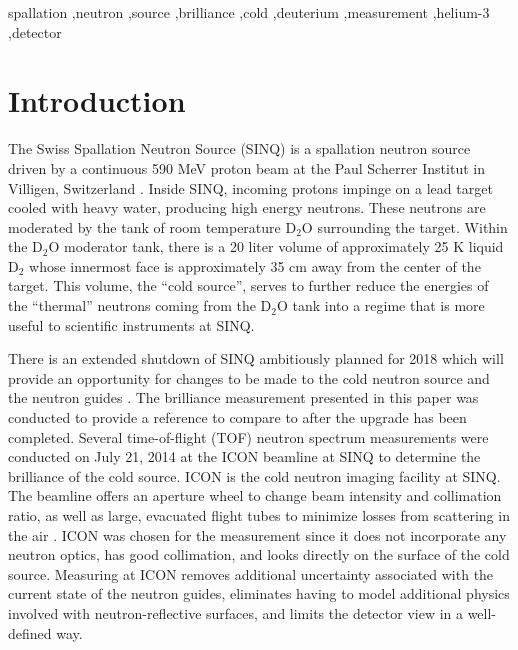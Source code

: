 \documentclass[5p,12pt]{elsarticle}
\begin{document}
\begin{frontmatter}
\begin{abstract}
\end{abstract}

\begin{keyword}
spallation \sep neutron \sep source \sep brilliance \sep cold \sep deuterium \sep measurement \sep helium-3 \sep detector


\end{keyword}


\end{frontmatter}



\section{Introduction}
\label{sec:intro}

The Swiss Spallation Neutron Source (SINQ) is a spallation neutron source driven by a continuous 590 MeV proton beam at the Paul Scherrer Institut in Villigen, Switzerland \cite{hipa}.  Inside SINQ, incoming protons impinge on a lead target cooled with heavy water, producing high energy neutrons.  These neutrons are moderated by the tank of room temperature D$_2$O surrounding the target.  Within the D$_2$O moderator tank, there is a 20 liter volume of approximately 25 K liquid D$_2$ whose innermost face is approximately 35 cm away from the center of the target.  This volume, the ``cold source'', serves to further reduce the energies of the ``thermal'' neutrons coming from the D$_2$O tank into a regime that is more useful to scientific instruments at SINQ.  

There is an extended shutdown of SINQ ambitiously planned for 2018 which will provide an opportunity for changes to be made to the cold neutron source and the neutron guides \cite{rueegg_icans}.  The brilliance measurement presented in this paper was conducted to provide a reference to compare to after the upgrade has been completed.  Several time-of-flight (TOF) neutron spectrum measurements were conducted on July 21, 2014 at the ICON beamline at SINQ to determine the brilliance of the cold source.  ICON is the cold neutron imaging facility at SINQ.  The beamline offers an aperture wheel to change beam intensity and collimation ratio, as well as large, evacuated flight tubes to minimize losses from scattering in the air \cite{icon}.  ICON was chosen for the measurement since it does not incorporate any neutron optics, has good collimation, and looks directly on the surface of the cold source.  Measuring at ICON removes additional uncertainty associated with the current state of the neutron guides, eliminates having to model additional physics involved with neutron-reflective surfaces, and limits the detector view in a well-defined way.
\end{document}
